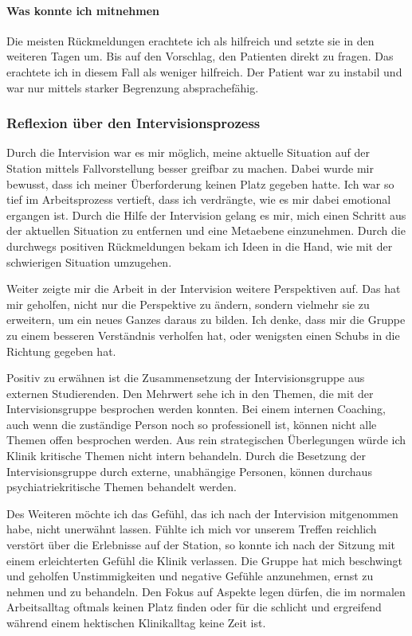 \paragraph{Was konnte ich mitnehmen}
Die meisten Rückmeldungen erachtete ich als hilfreich und setzte sie in den weiteren Tagen um. Bis auf den Vorschlag, den Patienten direkt zu fragen. Das erachtete ich in diesem Fall als weniger hilfreich. Der Patient war zu instabil und war nur mittels starker Begrenzung absprachefähig.  

\subsubsection{Reflexion über den Intervisionsprozess}
Durch die Intervision war es mir möglich, meine aktuelle Situation auf der Station mittels Fallvorstellung besser greifbar zu machen. Dabei wurde mir bewusst, dass ich meiner Überforderung keinen Platz gegeben hatte. Ich war so tief im Arbeitsprozess vertieft, dass ich verdrängte, wie es mir dabei emotional ergangen ist. Durch die Hilfe der Intervision gelang es mir, mich einen Schritt aus der aktuellen Situation zu entfernen und eine Metaebene einzunehmen. Durch die durchwegs positiven Rückmeldungen bekam ich Ideen in die Hand, wie mit der schwierigen Situation umzugehen. 

Weiter zeigte mir die Arbeit in der Intervision weitere Perspektiven auf. Das hat mir geholfen, nicht nur die Perspektive zu ändern, sondern vielmehr sie zu erweitern, um ein neues Ganzes daraus zu bilden. Ich denke, dass mir die Gruppe zu einem besseren Verständnis verholfen hat, oder wenigsten einen Schubs in die Richtung gegeben hat.

Positiv zu erwähnen ist die Zusammensetzung der Intervisionsgruppe aus externen Studierenden. Den Mehrwert sehe ich in den Themen, die mit der Intervisionsgruppe besprochen werden konnten. Bei einem internen Coaching, auch wenn die zuständige Person noch so professionell ist, können nicht alle Themen offen besprochen werden. Aus rein strategischen Überlegungen würde ich Klinik kritische Themen nicht intern behandeln. Durch die Besetzung der Intervisionsgruppe durch externe, unabhängige Personen, können durchaus psychiatriekritische Themen behandelt werden.

Des Weiteren möchte ich das Gefühl, das ich nach der Intervision mitgenommen habe, nicht unerwähnt lassen. Fühlte ich mich vor unserem Treffen reichlich verstört über die Erlebnisse auf der Station, so konnte ich nach der Sitzung mit einem erleichterten Gefühl die Klinik verlassen. Die Gruppe hat mich beschwingt und geholfen Unstimmigkeiten und negative Gefühle anzunehmen, ernst zu nehmen und zu behandeln. Den Fokus auf Aspekte legen dürfen, die im normalen Arbeitsalltag oftmals keinen Platz finden oder für die schlicht und ergreifend während einem hektischen Klinikalltag keine Zeit ist. 

